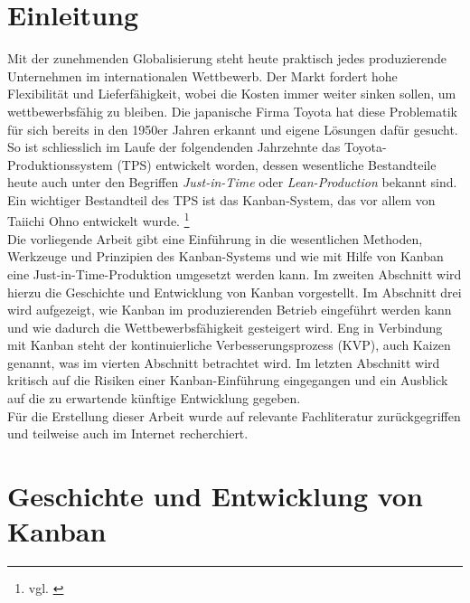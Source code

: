 \section{Einleitung}
Mit der zunehmenden Globalisierung steht heute praktisch jedes produzierende Unternehmen 
im internationalen Wettbewerb. Der Markt fordert hohe Flexibilität und Lieferfähigkeit, 
wobei die Kosten immer weiter sinken sollen, um wettbewerbsfähig zu bleiben.
Die japanische Firma Toyota hat diese Problematik für sich bereits in den 1950er
Jahren erkannt und eigene Lösungen dafür gesucht. So ist schliesslich im Laufe der
folgendenden Jahrzehnte das Toyota-Produktionssystem (TPS) entwickelt worden, dessen 
wesentliche Bestandteile heute auch unter den Begriffen  \emph{Just-in-Time} oder  
 \emph{Lean-Production} bekannt sind. Ein wichtiger Bestandteil des TPS ist das
Kanban-System, das vor allem von Taiichi Ohno entwickelt wurde.
\footnote{vgl. \cite{Ohno2013TPS}}\\
Die vorliegende Arbeit gibt eine Einführung in die wesentlichen Methoden, 
Werkzeuge und Prinzipien des Kanban-Systems und wie mit Hilfe von Kanban eine
Just-in-Time-Produktion umgesetzt werden kann. Im zweiten Abschnitt wird hierzu
die Geschichte und Entwicklung von Kanban vorgestellt.
Im Abschnitt drei wird aufgezeigt, wie Kanban im produzierenden Betrieb 
eingeführt werden kann und wie dadurch die Wettbewerbsfähigkeit gesteigert wird. 
Eng in Verbindung mit Kanban steht der kontinuierliche Verbesserungsprozess 
(KVP), auch Kaizen genannt, was im vierten Abschnitt betrachtet wird.
Im letzten Abschnitt wird kritisch auf die Risiken einer Kanban-Einführung
eingegangen und ein Ausblick auf die zu erwartende künftige Entwicklung gegeben.\\
Für die Erstellung dieser Arbeit wurde auf relevante Fachliteratur zurückgegriffen
und teilweise auch im Internet recherchiert.


\section{Geschichte und Entwicklung von Kanban}

